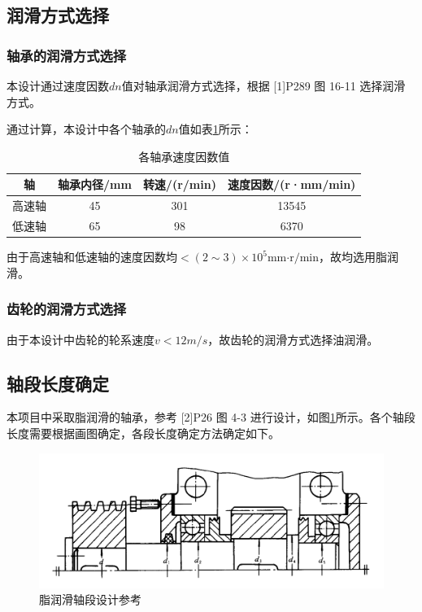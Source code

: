 \documentclass[12pt]{ctexart}
\begin{document}
\subsection{润滑方式选择}

\subsubsection{轴承的润滑方式选择}

本设计通过速度因数$dn$值对轴承润滑方式选择，根据 [1]P289 图 16-11 选择润滑方式。

通过计算，本设计中各个轴承的$dn$值如表\ref{table12}所示：

\begin{table}[htbp]
    \centering
    \setlength{\belowcaptionskip}{0.3cm}
    \caption{各轴承速度因数值}
    \begin{tabular}{c c c c}
        \toprule
        轴 & 轴承内径/mm & 转速/(r/min) & 速度因数/(r·mm/min)\\
        \midrule
        高速轴 & 45 & 301 & 13545 \\
        低速轴 & 65 & 98  & 6370  \\
        \bottomrule
    \end{tabular}
    
    \label{table12}
\end{table}

由于高速轴和低速轴的速度因数均$<(2\sim 3)\times 10^5 \text{mm·r/min}$，故均选用脂润滑。

\subsubsection{齿轮的润滑方式选择}

由于本设计中齿轮的轮系速度$v<12m/s$，故齿轮的润滑方式选择油润滑。

\subsection{轴段长度确定}

本项目中采取脂润滑的轴承，参考 [2]P26 图 4-3 进行设计，如图\ref{figure9}所示。各个轴段长度需要根据画图确定，各段长度确定方法确定如下。

\begin{figure}
    \centering
    \includegraphics[scale = 0.2]{[2]P26 roller.png}
    \caption{脂润滑轴段设计参考}\label{figure9}
\end{figure}
\end{document}
